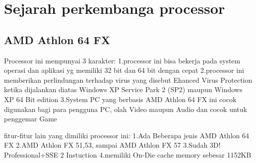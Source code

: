 \section{Sejarah perkembanga processor}
	\subsection{AMD Athlon 64 FX}
		Processor ini mempunyai 3 karakter:
		1.processor ini bisa bekerja pada system operasi dan aplikasi yg memiliki 32 bit dan 64 bit dengan cepat
		2.processor ini memberikan perlindungan terhadap virus yang disebut Ehanced Virus Protection ketika dijalankan diatas Windows XP Service Park 2 (SP2) maupun Windows XP 64 Bit edition
		3.System PC yang berbasis AMD Athlon 64 FX ini cocok digunakan bagi para pengguna PC, olah Video maupun Audio dan cocok untuk penggemar Game

		fitur-fitur lain yang dimiliki processor ini:
		1.Ada Beberapa jenis AMD Athlon 64 FX
		2.AMD Athlon FX 51,53, sampai AMD Athlon FX 57
		3.Sudah 3D! Professional+SSE 2 Instuction
		4.memiliki On-Die cache memory sebesar 1152KB
